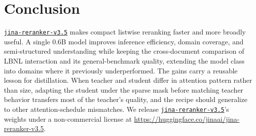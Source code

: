 \documentclass{article}
\newcommand{\jrrvthree}{\href{https://huggingface.co/jinaai/jina-reranker-v3}{\texttt{jina-reranker-v3}}}
\newcommand{\jrrvthreefive}{\href{https://huggingface.co/jinaai/jina-reranker-v3.5}{\texttt{jina-reranker-v3.5}}}
\begin{document}
\section{Conclusion}
\label{sec:conclusion}

\jrrvthreefive{} makes compact listwise reranking faster and more broadly useful. A single 0.6B model improves inference efficiency, domain coverage, and semi-structured understanding while keeping the cross-document comparison of LBNL interaction and its general-benchmark quality, extending the model class into domains where it previously underperformed. The gains carry a reusable lesson for distillation. When teacher and student differ in attention pattern rather than size, adapting the student under the sparse mask before matching teacher behavior transfers most of the teacher's quality, and the recipe should generalize to other attention-schedule mismatches. We release \jrrvthreefive{}'s weights under a non-commercial license at \url{https://huggingface.co/jinaai/jina-reranker-v3.5}.





\appendix
\end{document}
